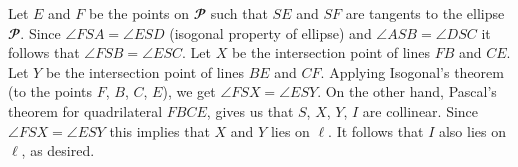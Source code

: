 \documentclass[14pt]{extarticle}
\renewcommand{\P}{\mathbfcal{P}}
\begin{document}
Let \(E\) and \(F\) be the points on \(\P\) such that \(SE\) and \(SF\) 
are tangents to the ellipse \(\P\). Since 
\(\angle FSA = \angle ESD\) (isogonal property of ellipse) and 
\(\angle ASB = \angle DSC\) it follows that \(\angle FSB = \angle ESC\).
Let \(X\) be the intersection point of lines \(FB\) and \(CE\). 
Let \(Y\) be the intersection point of lines \(BE\) and \(CF\). 
Applying Isogonal's theorem (to the points \(F\), \(B\), \(C\), \(E\)), 
we get \(\angle FSX = 
\angle ESY\). On the other hand, Pascal's theorem for quadrilateral 
\(FBCE\), gives us that \(S\), \(X\), \(Y\), \(I\) are collinear. Since 
\(\angle FSX = \angle ESY\) this implies that \(X\) and \(Y\) lies 
on \(\ell\). It follows that \(I\) also lies on \(\ell\), as desired.
\end{document}
